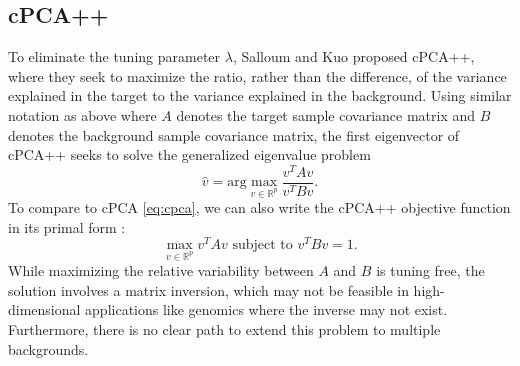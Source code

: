 \documentclass[12pt]{article}
\begin{document}
\subsection{cPCA++}
To eliminate the tuning parameter $\lambda$, Salloum and Kuo  \cite{Salloum} proposed cPCA++, where they seek to maximize the ratio, rather than the difference, of the variance explained in the target to the variance explained in the background.
Using similar notation as above where $A$ denotes the target sample covariance matrix and $B$ denotes the background sample covariance matrix, the first eigenvector of cPCA++ seeks to solve the generalized eigenvalue problem
\[\hat{v} = \text{arg}\max_{v\in \mathbb{R}^p} \frac{v^T A v}{v^T B v}.\]
To compare to cPCA \eqref{eq:cpca}, we can also write the cPCA++ objective function in its primal form \cite{ghojogh2019eigenvalue}:
\begin{equation}
  \label{eq:cpca++}
  \max_{v \in \mathbb{R}^p}{v^T A v}  \mbox{ subject to } v^T B v = 1.
\end{equation}
While maximizing the relative variability between $A$ and $B$ is tuning free, the solution involves a matrix inversion, which may not be feasible in high-dimensional applications like genomics where the inverse may not exist. Furthermore, there is no clear path to extend this problem to multiple backgrounds.


\end{document}
